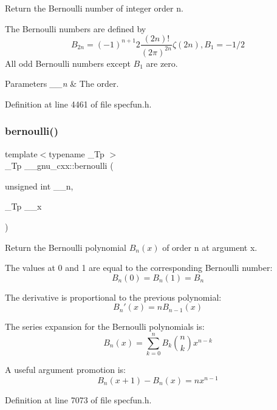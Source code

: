 Return the Bernoulli number of integer order {\ttfamily n}.

The Bernoulli numbers are defined by \[ B_{2n} = (-1)^{n+1} 2\frac{(2n)!}{(2\pi)^{2n}} \zeta(2n), B_1 = -1/2 \] All odd Bernoulli numbers except $ B_1 $ are zero.


\begin{DoxyParams}{Parameters}
{\em \+\_\+\+\_\+n} & The order. \\
\hline
\end{DoxyParams}


Definition at line 4461 of file specfun.\+h.

\mbox{\label{group__mathsf__gnu_ga140e17e038ab0e3875c1b3fad09bc991}} 
\subsubsection{\texorpdfstring{bernoulli()}{bernoulli()}\hspace{0.1cm}{\footnotesize\ttfamily [2/2]}}
{\footnotesize\ttfamily template$<$typename \+\_\+\+Tp $>$ \\
\+\_\+\+Tp \+\_\+\+\_\+gnu\+\_\+cxx\+::bernoulli (\begin{DoxyParamCaption}\item[{unsigned int}]{\+\_\+\+\_\+n,  }\item[{\+\_\+\+Tp}]{\+\_\+\+\_\+x }\end{DoxyParamCaption})\hspace{0.3cm}{\ttfamily [inline]}}

Return the Bernoulli polynomial $ B_n(x) $ of order n at argument x.

The values at 0 and 1 are equal to the corresponding Bernoulli number\+: \[ B_n(0) = B_n(1) = B_n \]

The derivative is proportional to the previous polynomial\+: \[ B_n'(x) = n B_{n-1}(x) \]

The series expansion for the Bernoulli polynomials is\+: \[ B_n(x) = \sum_{k=0}^{n} B_k \binom{n}{k} x^{n-k} \]

A useful argument promotion is\+: \[ B_n(x+1) - B_n(x) = n x^{n-1} \] 

Definition at line 7073 of file specfun.\+h.



